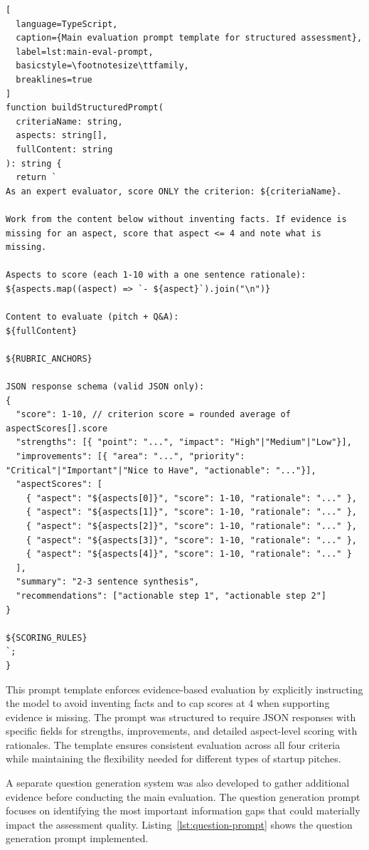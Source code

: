 \begin{lstlisting}[
  language=TypeScript,
  caption={Main evaluation prompt template for structured assessment},
  label=lst:main-eval-prompt,
  basicstyle=\footnotesize\ttfamily,
  breaklines=true
]
function buildStructuredPrompt(
  criteriaName: string,
  aspects: string[],
  fullContent: string
): string {
  return `
As an expert evaluator, score ONLY the criterion: ${criteriaName}.

Work from the content below without inventing facts. If evidence is 
missing for an aspect, score that aspect <= 4 and note what is missing.

Aspects to score (each 1-10 with a one sentence rationale):
${aspects.map((aspect) => `- ${aspect}`).join("\n")}

Content to evaluate (pitch + Q&A):
${fullContent}

${RUBRIC_ANCHORS}

JSON response schema (valid JSON only):
{
  "score": 1-10, // criterion score = rounded average of aspectScores[].score
  "strengths": [{ "point": "...", "impact": "High"|"Medium"|"Low"}],
  "improvements": [{ "area": "...", "priority": "Critical"|"Important"|"Nice to Have", "actionable": "..."}],
  "aspectScores": [
    { "aspect": "${aspects[0]}", "score": 1-10, "rationale": "..." },
    { "aspect": "${aspects[1]}", "score": 1-10, "rationale": "..." },
    { "aspect": "${aspects[2]}", "score": 1-10, "rationale": "..." },
    { "aspect": "${aspects[3]}", "score": 1-10, "rationale": "..." },
    { "aspect": "${aspects[4]}", "score": 1-10, "rationale": "..." }
  ],
  "summary": "2-3 sentence synthesis",
  "recommendations": ["actionable step 1", "actionable step 2"]
}

${SCORING_RULES}
`;
}
\end{lstlisting}

This prompt template enforces evidence-based evaluation by explicitly instructing the model to avoid inventing facts and to cap scores at 4 when supporting evidence is missing. The prompt was structured to require JSON responses with specific fields for strengths, improvements, and detailed aspect-level scoring with rationales. The template ensures consistent evaluation across all four criteria while maintaining the flexibility needed for different types of startup pitches.

A separate question generation system was also developed to gather additional evidence before conducting the main evaluation. The question generation prompt focuses on identifying the most important information gaps that could materially impact the assessment quality. Listing~\ref{lst:question-prompt} shows the question generation prompt implemented.

